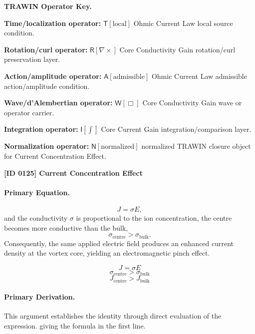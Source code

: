 \par\vspace{0.45\baselineskip}
\noindent\begin{minipage}[t]{\linewidth}
\begingroup
\small
\raggedright
\textbf{TRAWIN Operator Key.}\par
\noindent\textbf{Time/localization operator:} $\mathsf{T}\!\left[\mathrm{local}\right]$ Ohmic Current Law local source condition.\par
\noindent\textbf{Rotation/curl operator:} $\mathsf{R}\!\left[\nabla\times\right]$ Core Conductivity Gain rotation/curl preservation layer.\par
\noindent\textbf{Action/amplitude operator:} $\mathsf{A}\!\left[\mathrm{admissible}\right]$ Ohmic Current Law admissible action/amplitude condition.\par
\noindent\textbf{Wave/d'Alembertian operator:} $\mathsf{W}\!\left[\Box\right]$ Core Conductivity Gain wave or operator carrier.\par
\noindent\textbf{Integration operator:} $\mathsf{I}\!\left[\int\right]$ Core Current Gain integration/comparison layer.\par
\noindent\textbf{Normalization operator:} $\mathsf{N}\!\left[\mathrm{normalized}\right]$ normalized TRAWIN closure object for Current Concentration Effect.\par
\endgroup
\end{minipage}

\clearpage
\noindent\textbf{[ID 0125] Current Concentration Effect}\par
\vspace{0.35em}
\paragraph{Primary Equation.}
\[ J = \sigma E, \] and the conductivity $\sigma$ is proportional to the ion concentration, the centre becomes more conductive than the bulk, \[ \sigma_{\mathrm{centre}} > \sigma_{\mathrm{bulk}}. \] Consequently, the same applied electric field produces an enhanced current density at the vortex core, yielding an electromagnetic pinch effect.

\[
J = \sigma E
\]
\[
\sigma_{\mathrm{centre}} > \sigma_{\mathrm{bulk}}
\]
\[
J_{\mathrm{centre}} > J_{\mathrm{bulk}}
\]

\paragraph{Primary Derivation.}
This argument establishes the identity through direct evaluation of the expression. giving the formula in the first line.
